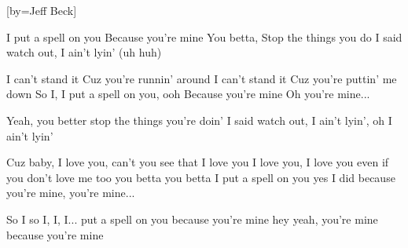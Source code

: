 [by={Jeff Beck}]

  \chordsoff


  \beginverse

  I put a spell on you
  Because you're mine
  You betta, Stop the things you do
  I said watch out, I ain't lyin' (uh huh)
  \endverse
  
  \beginchorus

  I can't stand it
  Cuz you're runnin' around
  I can't stand it
  Cuz you're puttin' me down
  So I, I put a spell on you, ooh
  Because you're mine
  Oh you're mine...
  \endchorus
  
  
  \beginverse
  Yeah, you better stop the things you're doin'
  I said watch out, I ain't lyin', oh I ain't lyin'
  \brk
  \endverse
  
  \beginchorus
  
  Cuz baby, I love you,
  can't you see that I love you
  I love you, I love you
  even if you don't love me too
  you betta you betta
  I put a spell on you
  yes I did
  because you're mine, you're mine...
  \endchorus

  \beginchorus
  So I so I, I, I... put a spell on you
  because you're mine
  hey yeah, you're mine
  because you're mine
  \endchorus
\endsong

